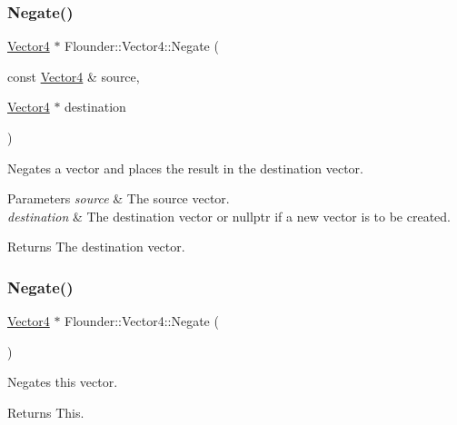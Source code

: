 \subsubsection{\texorpdfstring{Negate()}{Negate()}\hspace{0.1cm}{\footnotesize\ttfamily [1/2]}}
{\footnotesize\ttfamily \hyperlink{class_flounder_1_1_vector4}{Vector4} $\ast$ Flounder\+::\+Vector4\+::\+Negate (\begin{DoxyParamCaption}\item[{const \hyperlink{class_flounder_1_1_vector4}{Vector4} \&}]{source,  }\item[{\hyperlink{class_flounder_1_1_vector4}{Vector4} $\ast$}]{destination }\end{DoxyParamCaption})\hspace{0.3cm}{\ttfamily [static]}}



Negates a vector and places the result in the destination vector. 


\begin{DoxyParams}{Parameters}
{\em source} & The source vector. \\
\hline
{\em destination} & The destination vector or nullptr if a new vector is to be created. \\
\hline
\end{DoxyParams}
\begin{DoxyReturn}{Returns}
The destination vector. 
\end{DoxyReturn}
\mbox{\label{class_flounder_1_1_vector4_af6951719c4399059502dac2ff92e3bfe}} 
\subsubsection{\texorpdfstring{Negate()}{Negate()}\hspace{0.1cm}{\footnotesize\ttfamily [2/2]}}
{\footnotesize\ttfamily \hyperlink{class_flounder_1_1_vector4}{Vector4} $\ast$ Flounder\+::\+Vector4\+::\+Negate (\begin{DoxyParamCaption}{ }\end{DoxyParamCaption})}



Negates this vector. 

\begin{DoxyReturn}{Returns}
This. 
\end{DoxyReturn}
\mbox{\label{class_flounder_1_1_vector4_a5236dfda2985ef593f81269a43e904f2}} 
